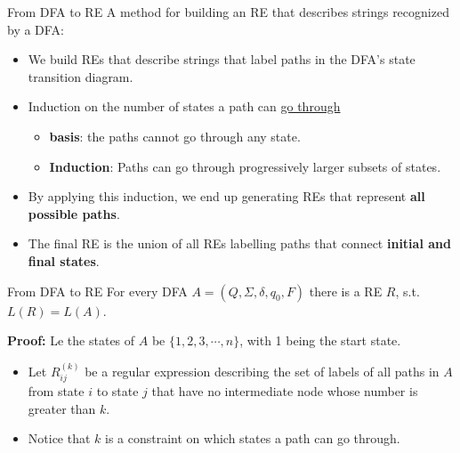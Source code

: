 \documentclass{prosper}%
\begin{document}
\begin{slide}{From DFA to RE}
A  method for building an RE that describes strings recognized by a DFA:
\begin{itemize}
\item We build REs that describe strings that label paths in the DFA's state transition diagram.
\item Induction on the {\blue number of states a path can \underline{go through}}
\begin{itemize}
\item {\bf basis}:  the paths cannot go through any state.
\item {\bf Induction}: Paths can go through progressively larger subsets of states.
\end{itemize}
\item By applying this induction, we end up generating REs that represent {\bf all possible paths}.
\item The final RE is the {\blue union} of all REs labelling paths that connect {\bf initial and final states}.
\end{itemize}
\end{slide}


\begin{slide}{From DFA to RE}
For every DFA $A=(Q, \Sigma, \delta, q_0, F)$ there is a RE $R$, s.t. $L(R)=L(A)$.

{\bf Proof:} Le the states of $A$ be $\{1,2,3,\cdots,n\}$, with 1 being the start state.
\begin{itemize}
\item Let $R_{ij}^{(k)}$ be a regular expression describing the set of labels of all paths in $A$ from state $i$ to state $j$ that have no intermediate node whose number is greater than $k$.
\item Notice that $k$ is a constraint on which states a path can go through.

\begin{comment}
\begin{center}
\texttt{[image: figures/re4-new.eps]}
\end{center}
\end{comment}
\end{itemize}
\end{slide}
\end{document}
